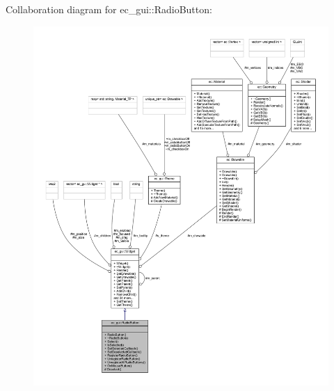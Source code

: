 Collaboration diagram for ec\+\_\+gui\+:\+:Radio\+Button\+:\nopagebreak
\begin{figure}[H]
\begin{center}
\leavevmode
\includegraphics[width=350pt]{classec__gui_1_1_radio_button__coll__graph}
\end{center}
\end{figure}
